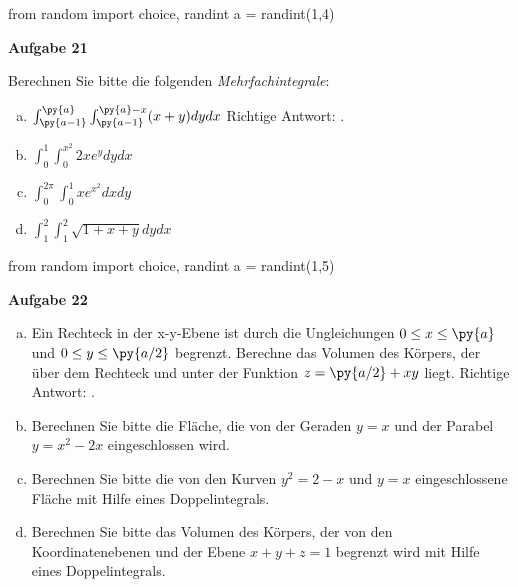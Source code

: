\documentclass[a4paper,12pt]{article}
\newcommand{\Aufgabe}[1]{
	{
		\vspace*{0.5cm}
		\textsf{\textbf{Aufgabe #1}}
		\vspace*{0.2cm}
		
	}
}
\begin{document}
\begin{pycode}
from random import choice, randint
a = randint(1,4)
\end{pycode}

\Aufgabe{21}
Berechnen Sie bitte die folgenden \textit{Mehrfachintegrale}:
\begin{multicols}{2}
	\begin{enumerate}[a)]
		\item $\int^{\py{a}}_{\py{a-1}} \int^{\py{a}-x}_{\py{a-1}} (x+y) dy dx$
		\ifnum{} 
		\newline Richtige Antwort: .
		\fi
		\item $\int^{1}_{0} \int^{x^2}_{0} 2x e^y dy dx$
		\item $\int^{2\pi}_{0} \int^{1}_{0} x e^{x^2}dx dy$
		\item $\int^{2}_{1} \int^{2}_{1} \sqrt{1+x+y} dy dx$	
	\end{enumerate}
\end{multicols}

\begin{pycode}
from random import choice, randint
a = randint(1,5)
\end{pycode}

\Aufgabe{22}
\begin{enumerate}[a)]
	
	\item Ein Rechteck in der x-y-Ebene ist durch  die Ungleichungen $0\leq x \leq \py{a}$ und $0 \leq y \leq \py{a/2}$ begrenzt. Berechne das Volumen des Körpers, der über dem Rechteck und unter der Funktion $z= \py{a/2} +xy$ liegt. 
	\ifnum{} 
		\newline Richtige Antwort: .
	\fi
	\item Berechnen Sie bitte die Fläche, die von der Geraden $y=x$ und der Parabel $y=x^2-2x$ eingeschlossen wird. %
	\item Berechnen Sie bitte die von den Kurven $y^2=2-x$ und $y=x$ eingeschlossene Fläche mit Hilfe eines Doppelintegrals.
	\item Berechnen Sie bitte das Volumen des Körpers, der von den Koordinatenebenen
	und der Ebene $x+y+z=1$ begrenzt wird mit Hilfe eines Doppelintegrals.
	
\end{enumerate}
\end{document}
